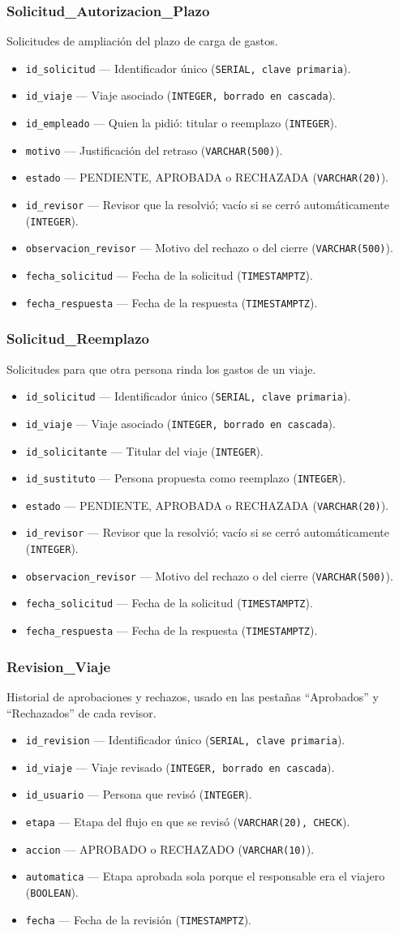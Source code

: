 \documentclass[11pt,letterpaper]{article}
\newcommand{\code}[1]{\nolinkurl{#1}}
\newcommand{\campo}[3]{\item \code{#1} --- #2 (\texttt{#3}).}
\begin{document}
\subsubsection{Solicitud\_Autorizacion\_Plazo}
Solicitudes de ampliación del plazo de carga de gastos.
\begin{itemize}
  \campo{id_solicitud}{Identificador único}{SERIAL, clave primaria}
  \campo{id_viaje}{Viaje asociado}{INTEGER, borrado en cascada}
  \campo{id_empleado}{Quien la pidió: titular o reemplazo}{INTEGER}
  \campo{motivo}{Justificación del retraso}{VARCHAR(500)}
  \campo{estado}{PENDIENTE, APROBADA o RECHAZADA}{VARCHAR(20)}
  \campo{id_revisor}{Revisor que la resolvió; vacío si se cerró automáticamente}{INTEGER}
  \campo{observacion_revisor}{Motivo del rechazo o del cierre}{VARCHAR(500)}
  \campo{fecha_solicitud}{Fecha de la solicitud}{TIMESTAMPTZ}
  \campo{fecha_respuesta}{Fecha de la respuesta}{TIMESTAMPTZ}
\end{itemize}

\subsubsection{Solicitud\_Reemplazo}
Solicitudes para que otra persona rinda los gastos de un viaje.
\begin{itemize}
  \campo{id_solicitud}{Identificador único}{SERIAL, clave primaria}
  \campo{id_viaje}{Viaje asociado}{INTEGER, borrado en cascada}
  \campo{id_solicitante}{Titular del viaje}{INTEGER}
  \campo{id_sustituto}{Persona propuesta como reemplazo}{INTEGER}
  \campo{estado}{PENDIENTE, APROBADA o RECHAZADA}{VARCHAR(20)}
  \campo{id_revisor}{Revisor que la resolvió; vacío si se cerró automáticamente}{INTEGER}
  \campo{observacion_revisor}{Motivo del rechazo o del cierre}{VARCHAR(500)}
  \campo{fecha_solicitud}{Fecha de la solicitud}{TIMESTAMPTZ}
  \campo{fecha_respuesta}{Fecha de la respuesta}{TIMESTAMPTZ}
\end{itemize}

\subsubsection{Revision\_Viaje}
Historial de aprobaciones y rechazos, usado en las pestañas ``Aprobados'' y ``Rechazados'' de cada revisor.
\begin{itemize}
  \campo{id_revision}{Identificador único}{SERIAL, clave primaria}
  \campo{id_viaje}{Viaje revisado}{INTEGER, borrado en cascada}
  \campo{id_usuario}{Persona que revisó}{INTEGER}
  \campo{etapa}{Etapa del flujo en que se revisó}{VARCHAR(20), CHECK}
  \campo{accion}{APROBADO o RECHAZADO}{VARCHAR(10)}
  \campo{automatica}{Etapa aprobada sola porque el responsable era el viajero}{BOOLEAN}
  \campo{fecha}{Fecha de la revisión}{TIMESTAMPTZ}
\end{itemize}
\end{document}
